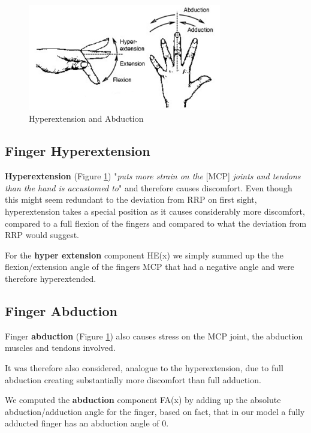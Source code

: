 \documentclass{sig-alternate-05-2015}
\begin{document}
\begin{figure}[b]
\centering
\includegraphics[width=8.45cm]{abduction}
\vspace{-20pt}
\caption{Hyperextension and Abduction}
\label{fig:hyperabduction}
\vspace{-10pt}
\end{figure}

\subsection{Finger Hyperextension}

\textbf{Hyperextension} (Figure \ref{fig:hyperabduction}) "\textit{puts more strain on the }[MCP] \textit{joints and tendons than the hand is accustomed to}" \cite{laviola1999survey} and therefore causes discomfort.\cite{laviola1999survey}
Even though this might seem redundant to the deviation from RRP on first sight, hyperextension takes a special position as it causes considerably more discomfort, compared to a full flexion of the fingers and compared to what the deviation from RRP would suggest.

For the \textbf{hyper extension} component HE(x) we simply summed up the the flexion/extension angle of the fingers MCP that had a negative angle and were therefore hyperextended.

\subsection{Finger Abduction}

Finger \textbf{abduction} (Figure \ref{fig:hyperabduction})
also causes stress on the MCP joint, the abduction muscles and tendons involved.

It was therefore also considered, analogue to the hyperextension, due to full abduction creating substantially more discomfort than full adduction.

We computed the \textbf{abduction} component FA(x) by adding up the absolute abduction/adduction angle for the finger, based on fact, that in our model a fully adducted finger has an abduction angle of 0.
\end{document}

